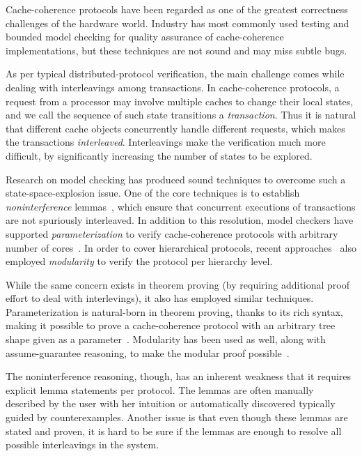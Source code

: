 \documentclass[sigplan,10pt,review,anonymous,screen]{acmart}\settopmatter{printfolios=true,printccs=false,printacmref=false}
\begin{document}
Cache-coherence protocols have been regarded as one of the greatest correctness challenges of the hardware world.
Industry has most commonly used testing and bounded model checking for quality assurance of cache-coherence implementations, but these techniques are not sound and may miss subtle bugs.

As per typical distributed-protocol verification, the main challenge comes while dealing with interleavings among transactions.
In cache-coherence protocols, a request from a processor may involve multiple caches to change their local states, and we call the sequence of such state transitions a \emph{transaction}.
Thus it is natural that different cache objects concurrently handle different requests, which makes the transactions \emph{interleaved}.
Interleavings make the verification much more difficult, by significantly increasing the number of states to be explored.

Research on model checking has produced sound techniques to overcome such a state-space-explosion issue.
One of the core techniques is to establish \emph{noninterference} lemmas~\cite{McMillan:1999,McMillan:2001,Chou:2004,flow:Talupur:2008,flow:OLeary:2009,flow:Sethi:2014}, which ensure that concurrent executions of transactions are not spuriously interleaved.
In addition to this resolution, model checkers have supported \emph{parameterization} to verify cache-coherence protocols with arbitrary number of cores~\cite{Zhang:2010,Zhang:2014,Banks:2017}.
In order to cover hierarchical protocols, recent approaches~\cite{Chen:2008,Chen:2010,Opeoluwa:2016,Opeoluwa:2017,Oswald:2020} also employed \emph{modularity} to verify the protocol per hierarchy level.

While the same concern exists in theorem proving (by requiring additional proof effort to deal with interlevings), it also has employed similar techniques.
Parameterization is natural-born in theorem proving, thanks to its rich syntax, making it possible to prove a cache-coherence protocol with an arbitrary tree shape given as a parameter~\cite{Murali:2015}.
Modularity has been used as well, along with assume-guarantee reasoning, to make the modular proof possible~\cite{McMillan:2016}.

The noninterference reasoning, though, has an inherent weakness that it requires explicit lemma statements per protocol.
The lemmas are often manually described by the user with her intuition or automatically discovered typically guided by counterexamples.
Another issue is that even though these lemmas are stated and proven, it is hard to be sure if the lemmas are enough to resolve all possible interleavings in the system.
\end{document}
